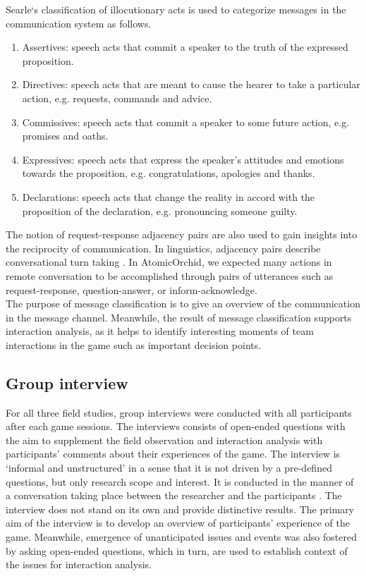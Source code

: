 Searle`s classification of illocutionary acts is used to categorize messages in the communication system as follows.\\

\begin{enumerate}
\item Assertives: speech acts that commit a speaker to the truth of the expressed proposition.
\item Directives: speech acts that are meant to cause the hearer to take a particular action, e.g. requests, commands and advice.
\item Commissives: speech acts that commit a speaker to some future action, e.g. promises and oaths.
\item Expressives: speech acts that express the speaker's attitudes and emotions towards the proposition, e.g. congratulations, apologies and thanks.
\item Declarations: speech acts that change the reality in accord with the proposition of the declaration, e.g. pronouncing someone guilty.
\end{enumerate}

The notion of request-response adjacency pairs are also used to gain insights into the reciprocity of communication. In linguistics, adjacency pairs describe conversational turn taking \cite{Avrahami}. In AtomicOrchid, we expected many actions in remote conversation to be accomplished through pairs of utterances such as request-response, question-answer, or inform-acknowledge.\\

The purpose of message classification is to give an overview of the communication in the message channel. Meanwhile, the result of message classification supports interaction analysis, as it helps to identify interesting moments of team interactions in the game such as important decision points.\\

\subsection{Group interview}
For all three field studies, group interviews were conducted with all participants after each game sessions. The interviews consists of open-ended questions with the aim to supplement the field observation and interaction analysis with participants' comments about their experiences of the game. The interview is `informal and unstructured' in a sense that it is not driven by a pre-defined questions, but only research scope and interest. It is conducted in the manner of a conversation taking place between the researcher and the participants \cite{Crabtree2012}. The interview does not stand on its own and provide distinctive results. The primary aim of the interview is to develop an overview of participants' experience of the game. Meanwhile, emergence of unanticipated issues and events was also fostered by asking open-ended questions, which in turn, are used to establish context of the issues for interaction analysis.\\

